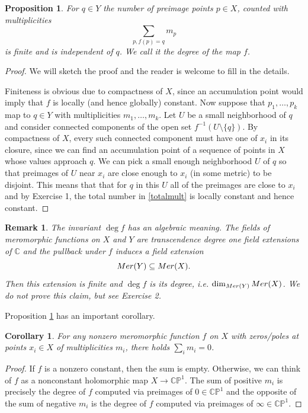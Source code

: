 \documentclass[11pt]{article}
\numberwithin{equation}{section}
\numberwithin{footnote}{section}
\newtheorem{cor}[thm]{Corollary}
\newtheorem{prop}[thm]{Proposition}
\newtheorem{rem}[thm]{Remark}
\newcommand{\blue}{\color{blue}}
\renewcommand{\P}{{\mathbb P}}
\newcommand{\C}{{\mathbb C}}
\begin{document}
\smallskip
\begin{prop}\label{deg}
For $q\in Y$ the number of preimage points $p\in X$, counted with multiplicities
\begin{equation}\label{totalmult}
\sum_{p,f(p)=q} m_p 
\end{equation}
is finite and is independent of $q$.
We call it the  {\blue degree} of the map $f$.
\end{prop}

\begin{proof}
We will sketch the proof and the reader is welcome to fill in the details.

Finiteness is obvious due to compactness of $X$, since an accumulation point would imply that $f$ is locally (and hence globally) constant. 
Now suppose that $p_1,\ldots,p_k$ map to $q\in Y$ with multiplicities $m_1,\ldots,m_k$. Let $U$ be a small neighborhood of $q$ and consider connected components of the open set $f^{-1}(U\setminus \{q\})$. By compactness of $X$, every such connected component must have one of $x_i$ in its closure, since we can find an accumulation point of a sequence of points in $X$ whose values approach $q$. We can pick a small enough neighborhood $U$ of $q$ so that preimages of $U$ near $x_i$ are close enough to $x_i$ (in some metric) to be disjoint. This means that that for $q$ in this $U$ all of the preimages are close to $x_i$ and by Exercise 1, the total number in \eqref{totalmult} is locally constant and hence constant.
\end{proof}

\begin{rem}\label{degalg}
The invariant $\deg f$ has an algebraic meaning. The fields of meromorphic functions on $X$ and $Y$ are transcendence degree one field extensions of $\C$ and the pullback under $f$ induces a field extension
$$
{\rm Mer}(Y)\subseteq {\rm Mer}(X).
$$
Then this extension is finite and $\deg f$ is its degree, i.e. $\dim_{{\rm Mer}(Y)}{\rm Mer(X)}$. We do not prove this claim, but see Exercise 2.
\end{rem}

Proposition \ref{deg} has an important corollary.
\smallskip
\begin{cor}\label{cor.zp}
For any nonzero meromorphic function $f$ on $X$ with zeros/poles at points $x_i\in X$ of multiplicities $m_i$, there holds
$\sum_i m_i=0$.
\end{cor}

\begin{proof}
If $f$ is a nonzero constant, then the sum is empty. Otherwise, we can think of $f$ as a nonconstant holomorphic map $X\to \C\P^1$. The sum of positive $m_i$ is precisely the degree of $f$ computed via preimages of $0\in \C\P^1$ and the opposite of the sum of negative $m_i$ is the degree of $f$ computed via preimages of $\infty\in \C\P^1$.
\end{proof}
\end{document}
